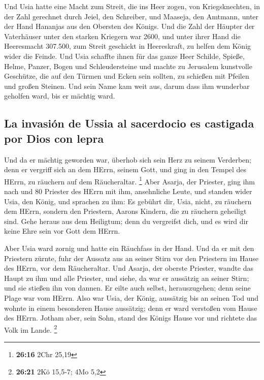  Und Usia hatte eine Macht zum Streit, die ins Heer
zogen, von Kriegsknechten, in der Zahl gerechnet durch Jeiel, den
Schreiber, und Maaseja, den Amtmann, unter der Hand Hananjas aus den
Obersten des Königs.  Und die Zahl der Häupter der
Vaterhäuser unter den starken Kriegern war 2600,  und
unter ihrer Hand die Heeresmacht 307.500, zum Streit geschickt in
Heereskraft, zu helfen dem König wider die Feinde.  Und
Usia schaffte ihnen für das ganze Heer Schilde, Spieße, Helme, Panzer,
Bogen und Schleudersteine  und machte zu Jerusalem
kunstvolle Geschütze, die auf den Türmen und Ecken sein sollten, zu
schießen mit Pfeilen und großen Steinen. Und sein Name kam weit aus,
darum dass ihm wunderbar geholfen ward, bis er mächtig ward.

\hypertarget{la-invasiuxf3n-de-ussia-al-sacerdocio-es-castigada-por-dios-con-lepra}{%
\subsection{La invasión de Ussia al sacerdocio es castigada por Dios con
lepra}\label{la-invasiuxf3n-de-ussia-al-sacerdocio-es-castigada-por-dios-con-lepra}}

 Und da er mächtig geworden war, überhob sich sein Herz
zu seinem Verderben; denn er vergriff sich an dem HErrn, seinem Gott,
und ging in den Tempel des HErrn, zu räuchern auf dem Räucheraltar.
\footnote{\textbf{26:16} 2Chr 25,19}  Aber Asarja, der
Priester, ging ihm nach und 80 Priester des HErrn mit ihm, ansehnliche
Leute,  und standen wider Usia, den König, und sprachen
zu ihm: Es gebührt dir, Usia, nicht, zu räuchern dem HErrn, sondern den
Priestern, Aarons Kindern, die zu räuchern geheiligt sind. Gehe heraus
aus dem Heiligtum; denn du vergreifst dich, und es wird dir keine Ehre
sein vor Gott dem HErrn.

 Aber Usia ward zornig und hatte ein Räuchfass in der
Hand. Und da er mit den Priestern zürnte, fuhr der Aussatz aus an seiner
Stirn vor den Priestern im Hause des HErrn, vor dem Räucheraltar.
 Und Asarja, der oberste Priester, wandte das Haupt zu
ihm und alle Priester, und siehe, da war er aussätzig an seiner Stirn;
und sie stießen ihn von dannen. Er eilte auch selbst, herauszugehen;
denn seine Plage war vom HErrn.  Also war Usia, der
König, aussätzig bis an seinen Tod und wohnte in einem besonderen Hause
aussätzig; denn er ward verstoßen vom Hause des HErrn. Jotham aber, sein
Sohn, stand des Königs Hause vor und richtete das Volk im Lande.
\footnote{\textbf{26:21} 2Kö 15,5-7; 4Mo 5,2}

